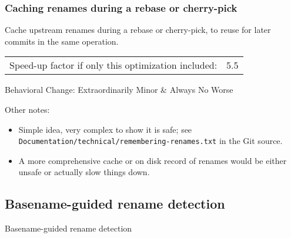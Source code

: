 \documentclass[compress,t]{beamer}
\begin{document}
\begin{frame}
  \frametitle{Caching renames during a rebase or cherry-pick}

  Cache upstream renames during a rebase or cherry-pick, to reuse for
  later commits in the same operation.

  \pause
  \vspace*{\baselineskip}
  \begin{tabular}{lr}
    Speed-up factor if only this optimization included:  & 5.5 \\
  \end{tabular}

  \vspace*{2\baselineskip}
  \pause
  {\scriptsize
  Behavioral Change: Extraordinarily Minor \& Always No Worse
  }

  \pause
  \vspace*{2\baselineskip}
  {\scriptsize
  Other notes:
  \begin{itemize}[<+(1)->]
    \item Simple idea, very complex to show it is safe;
          see \texttt{Documentation/technical/remembering-renames.txt} in
          the Git source.
    \item A more comprehensive cache or on disk record of renames would be
          either unsafe or actually slow things down.
  \end{itemize}
  }

\end{frame}

\subsection[Basenames]{Basename-guided rename detection}

\begin{frame}
  \vfill
  \vspace*{2\baselineskip}
  {\Huge
  \begin{center}Basename-guided rename detection\end{center}
  }
  \vfill
\end{frame}

\end{document}

